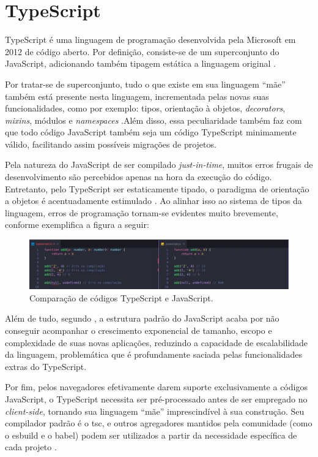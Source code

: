 \section{TypeScript}
\label{sec:typescript}
TypeScript é uma linguagem de programação desenvolvida pela Microsoft em 2012 de código aberto. Por definição, consiste-se de um superconjunto do JavaScript, adicionando também tipagem estática a linguagem original \cite{Microsoft2023}.

Por tratar-se de superconjunto, tudo o que existe em sua linguagem “mãe” também está presente nesta linguagem, incrementada pelas novas suas funcionalidades, como por exemplo: tipos, orientação à objetos, \textit{decorators}, \textit{mixins}, módulos e \textit{namespaces} \cite{Goldberg2022}.Além disso, essa peculiaridade também faz com que todo código JavaScript também seja um código TypeScript minimamente válido, facilitando assim possíveis migrações de projetos.

Pela natureza do JavaScript de ser compilado \textit{just-in-time}, muitos erros frugais de desenvolvimento são percebidos apenas na hora da execução do código. Entretanto, pelo TypeScript ser estaticamente tipado, o paradigma de orientação a objetos é acentuadamente estimulado \cite{Goldberg2022}. Ao alinhar isso ao sistema de tipos da linguagem, erros de programação tornam-se evidentes muito brevemente, conforme exemplifica a  figura a seguir:

\begin{figure}[H]
    \centering
    \caption{Comparação de códigos TypeScript e JavaScript.}
    \label{fig:typescript}
    \includegraphics[width=1\textwidth]{data/figures/typescript-javascript.jpg}
\end{figure}

Além de tudo, segundo , a estrutura padrão do JavaScript acaba por não conseguir acompanhar o crescimento exponencial de tamanho, escopo e complexidade de suas novas aplicações, reduzindo a capacidade de escalabilidade da linguagem, problemática que é profundamente saciada pelas funcionalidades extras do TypeScript.

Por fim, pelos navegadores efetivamente darem suporte exclusivamente a códigos JavaScript, o TypeScript necessita ser pré-processado antes de ser empregado no \textit{client-side}, tornando sua linguagem “mãe” imprescindível à sua construção. Seu compilador padrão é o tsc, e outros agregadores mantidos pela comunidade (como o esbuild e o babel) podem ser utilizados a partir da necessidade específica de cada projeto \cite{Microsoft2023a}.

